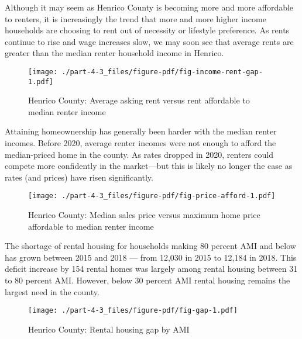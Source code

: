 \documentclass[
  letterpaper,
  DIV=11,
  numbers=noendperiod]{scrreprt}
\begin{document}
Although it may seem as Henrico County is becoming more and more
affordable to renters, it is increasingly the trend that more and more
higher income households are choosing to rent out of necessity or
lifestyle preference. As rents continue to rise and wage increases slow,
we may soon see that average rents are greater than the median renter
household income in Henrico.

\begin{figure}

{\centering \texttt{[image: ./part-4-3\_files/figure-pdf/fig-income-rent-gap-1.pdf]}

}

\caption{\label{fig-income-rent-gap}Henrico County: Average asking rent
versus rent affordable to median renter income}

\end{figure}

Attaining homeownership has generally been harder with the median renter
incomes. Before 2020, average renter incomes were not enough to afford
the median-priced home in the county. As rates dropped in 2020, renters
could compete more confidently in the market---but this is likely no
longer the case as rates (and prices) have risen significantly.

\begin{figure}

{\centering \texttt{[image: ./part-4-3\_files/figure-pdf/fig-price-afford-1.pdf]}

}

\caption{\label{fig-price-afford}Henrico County: Median sales price
versus maximum home price affordable to median renter income}

\end{figure}

The shortage of rental housing for households making 80 percent AMI and
below has grown between 2015 and 2018 --- from 12,030 in 2015 to 12,184
in 2018. This deficit increase by 154 rental homes was largely among
rental housing between 31 to 80 percent AMI. However, below 30 percent
AMI rental housing remains the largest need in the county.

\begin{figure}

{\centering \texttt{[image: ./part-4-3\_files/figure-pdf/fig-gap-1.pdf]}

}

\caption{\label{fig-gap}Henrico County: Rental housing gap by AMI}

\end{figure}
\end{document}
